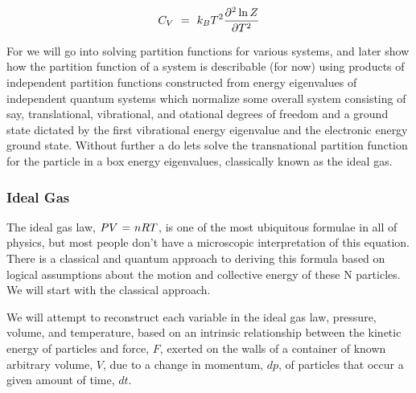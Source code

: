 \documentclass{article}
\newcounter{subsubsubsection}[subsubsection]
\begin{document}
\begin{equation} \label{eq:256}
C_V \hspace{0.125cm} = \hspace{0.125cm} k_B T^2 \frac{\partial^2 \ln{Z}}{\partial{T}^2}
\end{equation}

For we will go into solving partition functions for various systems, and later show how the partition function of a system is describable (for now) using products of independent partition functions constructed from energy eigenvalues of independent quantum systems which normalize some overall system consisting of say, translational, vibrational, and otational degrees of freedom and a ground state dictated by the first vibrational energy eigenvalue and the electronic energy ground state. Without further a do lets solve the transnational partition function for the particle in a box energy eigenvalues, classically known as the ideal gas. 




\subsubsection{Ideal Gas}

The ideal gas law, \begin{math} P V \hspace{0.025cm} = \hspace{0.025cm} n R T \end{math}, is one of the most ubiquitous formulae in all of physics, but most people don't have a microscopic interpretation of this equation. There is a classical and quantum approach to deriving this formula based on logical assumptions about the motion and collective energy of these N particles. We will start with the classical approach. 




We will attempt to reconstruct each variable in the ideal gas law, pressure, volume, and temperature, based on an intrinsic relationship between the kinetic energy of particles and force, \begin{math} F \end{math}, exerted on the walls of a container of known arbitrary volume, \begin{math} V \end{math}, due to a change in momentum, \begin{math} dp \end{math}, of particles that occur a given amount of time, \begin{math} dt \end{math}.
\end{document}
